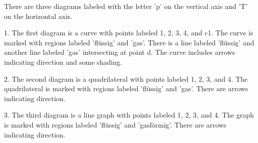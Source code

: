 There are three diagrams labeled with the letter 'p' on the vertical axis and 'T' on the horizontal axis. 

1. The first diagram is a curve with points labeled 1, 2, 3, 4, and c1. The curve is marked with regions labeled 'flüssig' and 'gas'. There is a line labeled 'flüssig' and another line labeled 'gas' intersecting at point d. The curve includes arrows indicating direction and some shading.

2. The second diagram is a quadrilateral with points labeled 1, 2, 3, and 4. The quadrilateral is marked with regions labeled 'flüssig' and 'gas'. There are arrows indicating direction.

3. The third diagram is a line graph with points labeled 1, 2, 3, and 4. The graph is marked with regions labeled 'flüssig' and 'gasförmig'. There are arrows indicating direction.